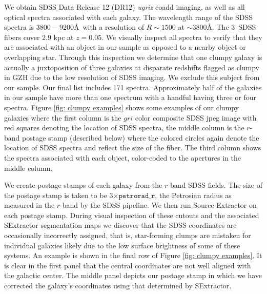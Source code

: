 We obtain SDSS Data Release 12 (DR12) \textit{ugriz} coadd imaging, as well as all optical spectra associated with each galaxy. The wavelength range of the SDSS spectra is $3800-9200$\AA~with a resolution of $R\sim 1500$ at $\sim3800$\AA. The $3$\arcsec~SDSS fibers cover 2.9 kpc at $z=0.05$. We visually inspect all spectra to verify that they are associated with an object in our sample as opposed to a nearby object or overlapping star. Through this inspection we determine that one clumpy galaxy is actually a juxtoposition of three galaxies at disparate redshifts flagged as clumpy in GZH due to the low resolution of SDSS imaging. We exclude this subject from our sample. Our final list includes 171 spectra. Approximately half of the galaxies in our sample have more than one spectrum with a handful having three or four spectra. Figure \ref{fig: clumpy examples} shows some examples of our clumpy galaxies where the first column is the $gri$ color composite SDSS jpeg image with red squares denoting the location of SDSS spectra, the middle column is the $r$-band postage stamp (described below) where the colored circles again denote the location of SDSS spectra and reflect the size of the fiber. The third column shows the spectra associated with each object, color-coded to the apertures in the middle column. 


We create postage stamps of each galaxy from the $r$-band SDSS fields.  The size of the postage stamp is taken to be 3$\times\mathtt{petrorad\_r}$, the Petrosian radius as measured in the $r$-band by the SDSS pipeline. We then run Source Extractor \citep{sextractor} on each postage stamp. During visual inspection of these cutouts and the associated SExtractor segmentation maps we discover that the SDSS coordinates are occasionally incorrectly assigned, that is, star-forming clumps are mistaken for individual galaxies likely due to the low surface brightness of some of these systems. An example is shown in the final row of Figure \ref{fig: clumpy examples}. It is clear in the first panel that the central coordinates are not well aligned with the galactic center. The middle panel depicts our postage stamp in which we have corrected the galaxy's coordinates using that determined by SExtractor. 


